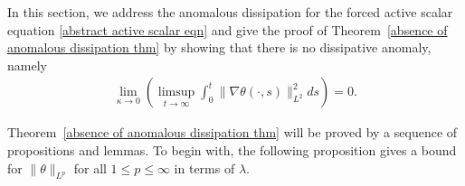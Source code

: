 \documentclass[reqno]{amsart}%
\theoremstyle{definition}
\theoremstyle{remark}
\numberwithin{equation}{section}
\newcommand{\1}{\mathbf{1}}
\newcommand{\R}{\mathbb R}
\numberwithin{equation}{section}
\numberwithin{theorem}{section}
\numberwithin{figure}{section}
\begin{document}
In this section, we address the anomalous dissipation for the forced active scalar equation \eqref{abstract active scalar eqn} and give the proof of Theorem~\ref{absence of anomalous dissipation thm} by showing that there is no dissipative anomaly, namely
\begin{align*}
\lim_{\kappa\to0}\left(\limsup_{t\to\infty}\int_{0}^{t}\|\nabla\theta(\cdot,s)\|_{L^2}^2ds\right)=0.
\end{align*}

Theorem~\ref{absence of anomalous dissipation thm} will be proved by a sequence of propositions and lemmas. To begin with, the following proposition gives a bound for $\|\theta\|_{L^p}$ for all $1\le p\le \infty$ in terms of $\lambda$.

\end{document}
